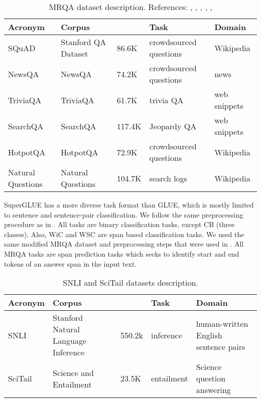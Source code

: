 \documentclass{article} \usepackage{iclr2021_conference,times}
\begin{document}
\begin{table}[H]
\caption{\small MRQA \citep{fisch2019mrqa} dataset description. References: \cite{squad}, \citet{newsqa}, \citet{triviaqa},  \citet{searchqa}, \citet{hotpotqa}, \citet{natq} }
\begin{center}
\footnotesize
\begin{tabular}{|l|l|l|l|l|}
	\hline 
		\textbf{Acronym} & \textbf{Corpus} &  & \textbf{Task} & \textbf{Domain}  \\
		\hline
		SQuAD             & Stanford QA Dataset & 86.6K  & crowdsourced questions & Wikipedia \\
		NewsQA            & NewsQA              & 74.2K  & crowdsourced questions & news \\
		TriviaQA          & TriviaQA            & 61.7K  & trivia QA & web snippets \\
		SearchQA          & SearchQA            & 117.4K & Jeopardy QA & web snippets \\
		HotpotQA          & HotpotQA            & 72.9K  & crowdsourced questions & Wikipedia \\
		Natural Questions & Natural Questions   & 104.7K & search logs & Wikipedia \\
    \hline
\end{tabular}
\end{center}

\end{table}
SuperGLUE has a more diverse task format than GLUE, which is mostly limited to sentence and sentence-pair classification. We follow the same preprocessing procedure as in \citet{superglue}. All tasks are binary classification tasks, except CB (three classes). Also, WiC and WSC are span based classification tasks. We used the same modified MRQA dataset and preprocessing steps that were used in \citet{DBLP:journals/corr/abs-1907-10529}. All MRQA tasks are span prediction tasks  which seeks to identify start and end tokens of an answer span in the input text.

\begin{table}[H]
\caption{\small SNLI \citep{snli:emnlp2015} and SciTail \citep{Khot2018SciTaiLAT} datasets description.}
\begin{center}
\small
\setlength{\tabcolsep}{2pt}
\begin{tabular}{|l|l|l|l|l|}
	\hline 
		\textbf{Acronym} & \textbf{Corpus} &  & \textbf{Task} & \textbf{Domain}  \\
		\hline
		SNLI             & Stanford Natural Language Inference & 550.2k  & inference & human-written English sentence pairs \\
		SciTail            & Science and Entailment              & 23.5K  & entailment & Science question answering \\
    \hline
\end{tabular}
\end{center}
\end{table}
\end{document}
